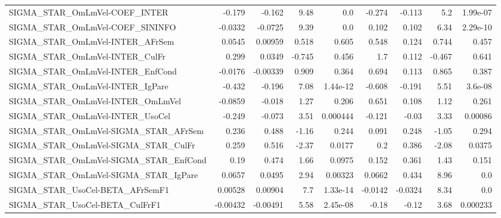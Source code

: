 \begin{tabular}{lrrrrrrrr}
SIGMA\_STAR\_OmLmVel-COEF\_INTER         &      -0.179 &       -0.162 &    9.48 &      0.0 &     -0.274 &      -0.113 &          5.2 &      1.99e-07 \\
SIGMA\_STAR\_OmLmVel-COEF\_SININFO       &     -0.0332 &      -0.0725 &    9.39 &      0.0 &      0.102 &       0.102 &         6.34 &      2.29e-10 \\
SIGMA\_STAR\_OmLmVel-INTER\_AFrSem       &      0.0545 &      0.00959 &   0.518 &    0.605 &      0.548 &       0.124 &        0.744 &         0.457 \\
SIGMA\_STAR\_OmLmVel-INTER\_CulFr        &       0.299 &       0.0349 &  -0.745 &    0.456 &        1.7 &       0.112 &       -0.467 &         0.641 \\
SIGMA\_STAR\_OmLmVel-INTER\_EnfCond      &     -0.0176 &     -0.00339 &   0.909 &    0.364 &      0.694 &       0.113 &        0.865 &         0.387 \\
SIGMA\_STAR\_OmLmVel-INTER\_IgPare       &      -0.432 &       -0.196 &    7.08 & 1.44e-12 &     -0.608 &      -0.191 &         5.51 &       3.6e-08 \\
SIGMA\_STAR\_OmLmVel-INTER\_OmLmVel      &     -0.0859 &       -0.018 &    1.27 &    0.206 &      0.651 &       0.108 &         1.12 &         0.261 \\
SIGMA\_STAR\_OmLmVel-INTER\_UsoCel       &      -0.249 &       -0.073 &    3.51 & 0.000444 &     -0.121 &       -0.03 &         3.33 &       0.00086 \\
SIGMA\_STAR\_OmLmVel-SIGMA\_STAR\_AFrSem  &       0.236 &        0.488 &   -1.16 &    0.244 &      0.091 &       0.248 &        -1.05 &         0.294 \\
SIGMA\_STAR\_OmLmVel-SIGMA\_STAR\_CulFr   &       0.259 &        0.516 &   -2.37 &   0.0177 &        0.2 &       0.386 &        -2.08 &        0.0375 \\
SIGMA\_STAR\_OmLmVel-SIGMA\_STAR\_EnfCond &        0.19 &        0.474 &    1.66 &   0.0975 &      0.152 &       0.361 &         1.43 &         0.151 \\
SIGMA\_STAR\_OmLmVel-SIGMA\_STAR\_IgPare  &      0.0657 &       0.0495 &    2.94 &  0.00323 &     0.0662 &       0.434 &         8.96 &           0.0 \\
SIGMA\_STAR\_UsoCel-BETA\_AFrSemF1       &     0.00528 &      0.00904 &     7.7 & 1.33e-14 &    -0.0142 &     -0.0324 &         8.34 &           0.0 \\
SIGMA\_STAR\_UsoCel-BETA\_CulFrF1        &    -0.00432 &     -0.00491 &    5.58 & 2.45e-08 &      -0.18 &       -0.12 &         3.68 &      0.000233 \\

\end{tabular}
